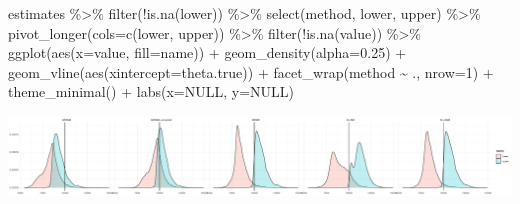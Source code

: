 \documentclass[
]{article}
\newenvironment{Shaded}{\begin{snugshade}}{\end{snugshade}}
\newcommand{\AttributeTok}[1]{\textcolor[rgb]{0.77,0.63,0.00}{#1}}
\newcommand{\ConstantTok}[1]{\textcolor[rgb]{0.00,0.00,0.00}{#1}}
\newcommand{\DecValTok}[1]{\textcolor[rgb]{0.00,0.00,0.81}{#1}}
\newcommand{\FloatTok}[1]{\textcolor[rgb]{0.00,0.00,0.81}{#1}}
\newcommand{\FunctionTok}[1]{\textcolor[rgb]{0.00,0.00,0.00}{#1}}
\newcommand{\NormalTok}[1]{#1}
\newcommand{\SpecialCharTok}[1]{\textcolor[rgb]{0.00,0.00,0.00}{#1}}
\begin{document}
\begin{Shaded}
\begin{Highlighting}[]
\NormalTok{estimates }\SpecialCharTok{\%\textgreater{}\%}
  \FunctionTok{filter}\NormalTok{(}\SpecialCharTok{!}\FunctionTok{is.na}\NormalTok{(lower)) }\SpecialCharTok{\%\textgreater{}\%}
  \FunctionTok{select}\NormalTok{(method, lower, upper) }\SpecialCharTok{\%\textgreater{}\%}
  \FunctionTok{pivot\_longer}\NormalTok{(}\AttributeTok{cols=}\FunctionTok{c}\NormalTok{(lower, upper)) }\SpecialCharTok{\%\textgreater{}\%}
  \FunctionTok{filter}\NormalTok{(}\SpecialCharTok{!}\FunctionTok{is.na}\NormalTok{(value)) }\SpecialCharTok{\%\textgreater{}\%}
  \FunctionTok{ggplot}\NormalTok{(}\FunctionTok{aes}\NormalTok{(}\AttributeTok{x=}\NormalTok{value, }\AttributeTok{fill=}\NormalTok{name)) }\SpecialCharTok{+}
  \FunctionTok{geom\_density}\NormalTok{(}\AttributeTok{alpha=}\FloatTok{0.25}\NormalTok{) }\SpecialCharTok{+}
  \FunctionTok{geom\_vline}\NormalTok{(}\FunctionTok{aes}\NormalTok{(}\AttributeTok{xintercept=}\NormalTok{theta.true)) }\SpecialCharTok{+}
  \FunctionTok{facet\_wrap}\NormalTok{(method }\SpecialCharTok{\textasciitilde{}}\NormalTok{ ., }\AttributeTok{nrow=}\DecValTok{1}\NormalTok{) }\SpecialCharTok{+}
  \FunctionTok{theme\_minimal}\NormalTok{() }\SpecialCharTok{+}
  \FunctionTok{labs}\NormalTok{(}\AttributeTok{x=}\ConstantTok{NULL}\NormalTok{, }\AttributeTok{y=}\ConstantTok{NULL}\NormalTok{)}
\end{Highlighting}
\end{Shaded}

\includegraphics{sim_exp-results_files/figure-latex/unnamed-chunk-6-1.pdf}
\end{document}
